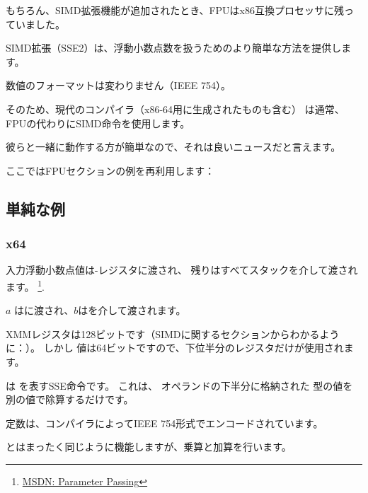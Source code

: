 ﻿%

\label{floating_SIMD}

もちろん、\ac{SIMD}拡張機能が追加されたとき、\ac{FPU}はx86互換プロセッサに残っていました。

\ac{SIMD}拡張（SSE2）は、浮動小数点数を扱うためのより簡単な方法を提供します。

数値のフォーマットは変わりません（IEEE 754）。

そのため、現代のコンパイラ（x86-64用に生成されたものも含む）
は通常、FPUの代わりに\ac{SIMD}命令を使用します。

彼らと一緒に動作する方が簡単なので、それは良いニュースだと言えます。

ここではFPUセクションの例を再利用します：

\subsection{単純な例}



\subsubsection{x64}



入力浮動小数点値は-レジスタに渡され、
残りはすべてスタックを介して渡されます。
\footnote{\href{http://go.yurichev.com/17263}{MSDN: Parameter Passing}}.

$a$ はに渡され、$b$はを介して渡されます。

XMMレジスタは128ビットです（SIMDに関するセクションからわかるように：）。
しかし \Tdouble 値は64ビットですので、下位半分のレジスタだけが使用されます。

は
を表すSSE命令です。
これは、
オペランドの下半分に格納された \Tdouble 型の値を別の値で除算するだけです。

定数は、コンパイラによってIEEE 754形式でエンコードされています。

とはまったく同じように機能しますが、乗算と加算を行います。

